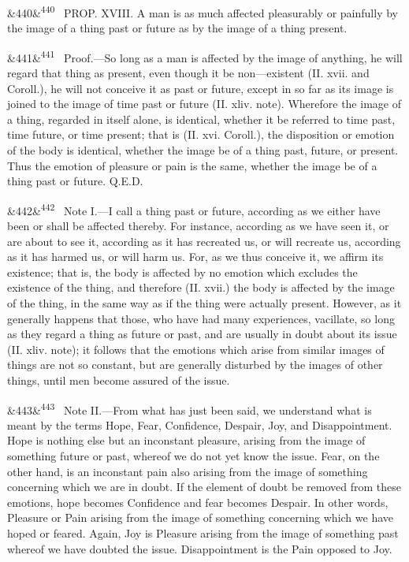 \documentclass[12pt]{article}
\newcommand{\para}[1][]{\par\noindent\ifx&#1&\else\textsuperscript{\footnotesize #1}~\fi}
\begin{document}
\para[440] PROP. XVIII. A man is as much affected pleasurably or painfully by the image of a thing past or future as by the image of a thing present.

\para[441] Proof.---So long as a man is affected by the image of anything, he will regard that thing as present, even though it be non---existent (II. xvii. and Coroll.), he will not conceive it as past or future, except in so far as its image is joined to the image of time past or future (II. xliv. note). Wherefore the image of a thing, regarded in itself alone, is identical, whether it be referred to time past, time future, or time present; that is (II. xvi. Coroll.), the disposition or emotion of the body is identical, whether the image be of a thing past, future, or present. Thus the emotion of pleasure or pain is the same, whether the image be of a thing past or future. Q.E.D.

\para[442] Note I.---I call a thing past or future, according as we either have been or shall be affected thereby. For instance, according as we have seen it, or are about to see it, according as it has recreated us, or will recreate us, according as it has harmed us, or will harm us. For, as we thus conceive it, we affirm its existence; that is, the body is affected by no emotion which excludes the existence of the thing, and therefore (II. xvii.) the body is affected by the image of the thing, in the same way as if the thing were actually present. However, as it generally happens that those, who have had many experiences, vacillate, so long as they regard a thing as future or past, and are usually in doubt about its issue (II. xliv. note); it follows that the emotions which arise from similar images of things are not so constant, but are generally disturbed by the images of other things, until men become assured of the issue.

\para[443] Note II.---From what has just been said, we understand what is meant by the terms Hope, Fear, Confidence, Despair, Joy, and Disappointment. Hope is nothing else but an inconstant pleasure, arising from the image of something future or past, whereof we do not yet know the issue. Fear, on the other hand, is an inconstant pain also arising from the image of something concerning which we are in doubt. If the element of doubt be removed from these emotions, hope becomes Confidence and fear becomes Despair. In other words, Pleasure or Pain arising from the image of something concerning which we have hoped or feared. Again, Joy is Pleasure arising from the image of something past whereof we have doubted the issue. Disappointment is the Pain opposed to Joy.
\end{document}
